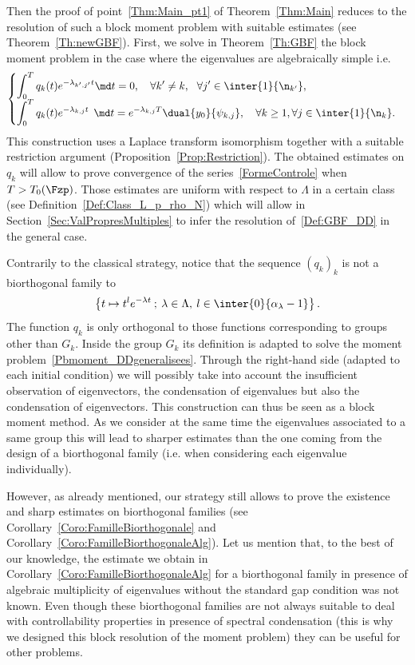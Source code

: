 Then the proof of point~\eqref{Thm:Main_pt1} of Theorem~\ref{Thm:Main} reduces to the resolution of such a block moment problem with suitable estimates (see Theorem~\ref{Th:newGBF}). First, we solve in Theorem~\ref{Th:GBF} the block moment problem in the case where the eigenvalues are algebraically simple i.e.
\begin{equation}\label{Def:GBF}
\begin{cases}
\displaystyle\int_0^T q_k(t) e^{-\lambda_{k',j'} t} \md t = 0, \quad \forall k' \neq k, \ \ \forall j'\in \inter{1}{\n_{k'}},
\\[0.15em]
\displaystyle \int_0^T q_k(t) e^{-\lambda_{k,j} t} \;\,\md t = e^{-\lambda_{k,j}T} \dual{y_0}{\psi_{k,j}}, \quad \forall k \geq 1, \forall j \in \inter{1}{\n_k}.
\end{cases}
\end{equation}
This construction uses a Laplace transform isomorphism together with a suitable restriction argument (Proposition~\ref{Prop:Restriction}). The obtained estimates on $q_k$ will allow to prove convergence of the series~\eqref{FormeControle} when $T>T_0(\Fzp)$. Those estimates are uniform with respect to $\Lambda$ in a certain class (see Definition~\ref{Def:Class_L_p_rho_N}) which will allow in Section~\ref{Sec:ValPropresMultiples} to infer the resolution of~\eqref{Def:GBF_DD} in the general case.

\begin{rema}
Contrarily to the classical strategy, notice that the sequence $(q_k)_k$ is not a biorthogonal family to
\[
\left\{ t \mapsto t^l e^{-\lambda t} \: ; \: \lambda \in \Lambda, \: l \in \inter{0}{\alpha_\lambda -1} \right\}.
\]
The function $q_k$ is only orthogonal to those functions corresponding to groups other than $G_k$. Inside the group $G_k$ its definition is adapted to solve the moment problem~\eqref{Pbmoment_DDgeneralisees}. Through the right-hand side (adapted to each initial condition) we will possibly take into account the insufficient observation of eigenvectors, the condensation of eigenvalues but also the condensation of eigenvectors. This construction can thus be seen as a block moment method. As we consider at the same time the eigenvalues associated to a same group this will lead to sharper estimates than the one coming from the design of a biorthogonal family (i.e. when considering each eigenvalue individually).

However, as already mentioned, our strategy still allows to prove the existence and sharp estimates on biorthogonal families (see Corollary~\ref{Coro:FamilleBiorthogonale} and Corollary~\ref{Coro:FamilleBiorthogonaleAlg}). Let us mention that, to the best of our knowledge, the estimate we obtain in Corollary~\ref{Coro:FamilleBiorthogonaleAlg} for a biorthogonal family in presence of algebraic multiplicity of eigenvalues without the standard gap condition was not known. Even though these biorthogonal families are not always suitable to deal with controllability properties in presence of spectral condensation (this is why we designed this block resolution of the moment problem) they can be useful for other problems.
\end{rema}


